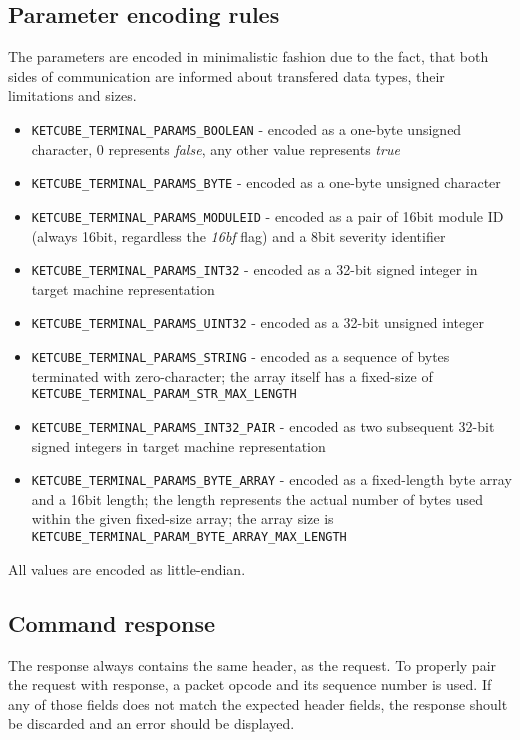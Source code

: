\subsection{Parameter encoding rules}

The parameters are encoded in minimalistic fashion due to the fact, that both sides of communication are informed about transfered data types, their limitations and sizes.

\begin{itemize}
	\item \texttt{KETCUBE\_TERMINAL\_PARAMS\_BOOLEAN} - encoded as a one-byte unsigned character, 0 represents \textit{false}, any other value represents \textit{true}
	\item \texttt{KETCUBE\_TERMINAL\_PARAMS\_BYTE} - encoded as a one-byte unsigned character
	\item \texttt{KETCUBE\_TERMINAL\_PARAMS\_MODULEID} - encoded as a pair of 16bit module ID (always 16bit, regardless the \textit{16bf} flag) and a 8bit severity identifier
	\item \texttt{KETCUBE\_TERMINAL\_PARAMS\_INT32} - encoded as a 32-bit signed integer in target machine representation
	\item \texttt{KETCUBE\_TERMINAL\_PARAMS\_UINT32} - encoded as a 32-bit unsigned integer
	\item \texttt{KETCUBE\_TERMINAL\_PARAMS\_STRING} - encoded as a sequence of bytes terminated with zero-character; the array itself has a fixed-size of \texttt{KETCUBE\_TERMINAL\_PARAM\_STR\_MAX\_LENGTH}
	\item \texttt{KETCUBE\_TERMINAL\_PARAMS\_INT32\_PAIR} - encoded as two subsequent 32-bit signed integers in target machine representation
	\item \texttt{KETCUBE\_TERMINAL\_PARAMS\_BYTE\_ARRAY} - encoded as a fixed-length byte array and a 16bit length; the length represents the actual number of bytes used within the given fixed-size array; the array size is \texttt{KETCUBE\_TERMINAL\_PARAM\_BYTE\_ARRAY\_MAX\_LENGTH}
\end{itemize}

All values are encoded as little-endian.

\subsection{Command response}

The response always contains the same header, as the request. To properly pair the request with response, a packet opcode and its sequence number is used. If any of those fields does not match the expected header fields, the response shoult be discarded and an error should be displayed.

